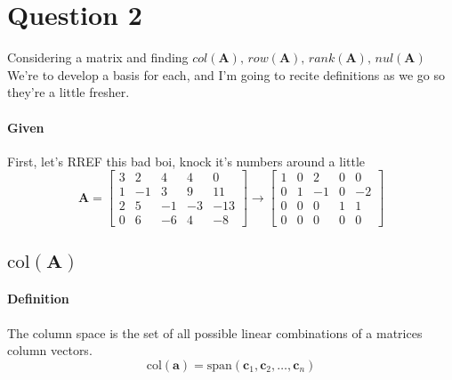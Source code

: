 \documentclass{article}
\begin{document}
    \section{Question 2}
        Considering a matrix and finding $col(\mathbf{A}),\,row(\mathbf{A}),\,rank(\mathbf{A}),\,nul(\mathbf{A})$
        We're to develop a basis for each, and I'm going to recite definitions as we go so they're a little fresher.
        \paragraph{Given}
            First, let's RREF this bad boi, knock it's numbers around a little
        \[
            \mathbf{A}=\begin{bmatrix}3&2&4&4&0\\1&-1&3&9&11\\2&5&-1&-3&-13\\0&6&-6&4&-8\end{bmatrix}
            \rightarrow
            \begin{bmatrix}1&0&2&0&0\\0&1&-1&0&-2\\0&0&0&1&1\\0&0&0&0&0\end{bmatrix}
        \]
        \subsection[The column space of A]{$\text{col}(\mathbf{A})$}
            \paragraph{Definition}
                The column space is the set of all possible linear combinations of a matrices column vectors.
                \[
                    \text{col}(\mathbf{a})=\text{span}(\mathbf{c}_1,\mathbf{c}_2,\dots,\mathbf{c}_n)
                \]
\end{document}
